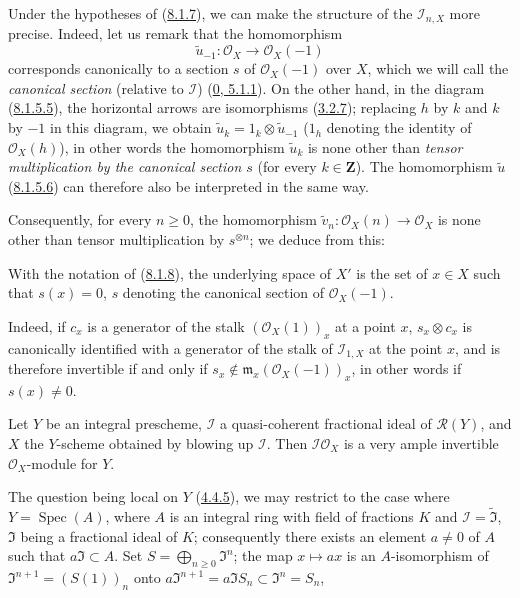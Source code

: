 \begin{env}[8.1.9]
\label{II.8.1.9}
Under the hypotheses of (\hyperref[II.8.1.7]{8.1.7}), we can make the
structure of the $\mathcal{I}_{n,X}$ more precise. Indeed, let us remark that the homomorphism
\[
  \widetilde{u}_{-1}:\mathcal{O}_X\to\mathcal{O}_X(-1)
\]
corresponds canonically to a section $s$ of $\mathcal{O}_X(-1)$ over
$X$, which we will call the \emph{canonical section} (relative to
$\mathcal{I}$) (\hyperref[0.5.1.1]{0, 5.1.1}). On the other hand, in the
diagram (\hyperref[II.8.1.5.5]{8.1.5.5}), the horizontal arrows are
isomorphisms (\hyperref[II.3.2.7]{3.2.7}); replacing $h$ by $k$ and $k$ by
$-1$ in this diagram, we obtain
$\widetilde{u}_k=1_k\otimes\widetilde{u}_{-1}$ ($1_h$ denoting the identity of
$\mathcal{O}_X(h)$), in other words the homomorphism $\widetilde{u}_k$ is
none other than \emph{tensor multiplication by the canonical section $s$}
(for every $k\in\mathbf{Z}$). The homomorphism $\widetilde{u}$
(\hyperref[II.8.1.5.6]{8.1.5.6}) can therefore also be interpreted in the same way.

Consequently, for every $n\geq0$, the homomorphism
$\widetilde{v}_n:\mathcal{O}_X(n)\to\mathcal{O}_X$ is none other than
tensor multiplication by $s^{\otimes n}$; we deduce from this:
\end{env}

\begin{corollary}[8.1.10]
\label{II.8.1.10}
With the notation of (\hyperref[II.8.1.8]{8.1.8}), the underlying space of
$X'$ is the set of $x\in X$ such that $s(x)=0$, $s$ denoting the canonical
section of $\mathcal{O}_X(-1)$.
\end{corollary}

Indeed, if $c_x$ is a generator of the stalk $(\mathcal{O}_X(1))_x$ at a
point $x$, $s_x\otimes c_x$ is canonically identified with a generator of the
stalk of $\mathcal{I}_{1,X}$ at the point $x$, and is therefore invertible if and
only if $s_x\notin\mathfrak{m}_x(\mathcal{O}_X(-1))_x$, in other words if
$s(x)\neq0$.

\begin{proposition}[8.1.11]
\label{II.8.1.11}
Let $Y$ be an integral prescheme, $\mathcal{I}$ a quasi-coherent fractional
ideal of $\mathcal{R}(Y)$, and $X$ the $Y$-scheme obtained by blowing up
$\mathcal{I}$. Then $\mathcal{I}\mathcal{O}_X$ is a very ample invertible
$\mathcal{O}_X$-module for $Y$.
\end{proposition}

The question being local on $Y$ (\hyperref[II.4.4.5]{4.4.5}), we may
restrict to the case where $Y=\operatorname{Spec}(A)$, where $A$ is an integral
ring with field of fractions $K$ and $\mathcal{I}=\widetilde{\mathfrak{I}}$,
$\mathfrak{I}$ being a fractional ideal of $K$; consequently there exists an
element $a\neq0$ of $A$ such that $a\mathfrak{I}\subset A$. Set
$S=\bigoplus_{n\geq0}\mathfrak{I}^n$; the map $x\mapsto ax$ is an
$A$-isomorphism of $\mathfrak{I}^{n+1}=(S(1))_n$ onto
$a\mathfrak{I}^{n+1}=a\mathfrak{I}S_n\subset\mathfrak{I}^n=S_n$,

